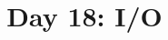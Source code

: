 \documentclass{article}
\begin{document}
\title{Day 18: I/O}
\author{}
\date{}

\maketitle


\end{document}
